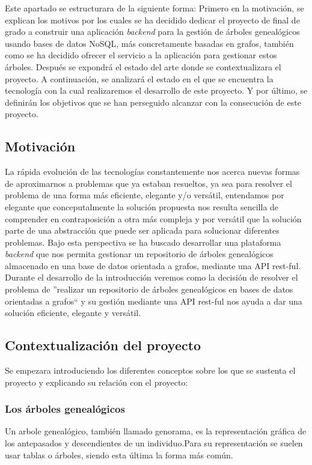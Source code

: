 
Este apartado se estructurara de la siguiente forma: Primero en la motivación, se explican los motivos por los cuales se ha decidido dedicar el proyecto de final de grado a construir una aplicación \textit{backend} para la gestión de árboles genealógicos usando bases de datos NoSQL, más concretamente basadas en grafos, también como se ha decidido ofrecer el servicio a la aplicación para gestionar estos árboles. Después se expondrá el estado del arte donde se contextualizara el proyecto. A continuación, se analizará el estado en el que se encuentra la tecnología con la cual realizaremos el desarrollo de este proyecto. Y por último, se definirán los objetivos que se han perseguido alcanzar con la consecución de este proyecto.

\subsection{Motivación}
La rápida evolución de las tecnologías constantemente nos acerca nuevas formas de aproximarnos a problemas que ya estaban resueltos, ya sea para resolver el problema de una forma más eficiente, elegante y/o versátil, entendamos por elegante que conceputalmente la solución propuesta nos resulta sencilla de comprender en contraposición a otra más compleja y por versátil que la solución parte de una abstracción que puede ser aplicada para solucionar diferentes problemas. Bajo esta perspectiva se ha buscado desarrollar una plataforma \textit{backend} que nos permita gestionar un repositorio de árboles genealógicos almacenado en una base de datos orientada a grafos, mediante una API rest-ful. Durante el desarrollo de la introducción veremos como la decisión de resolver el problema de ''realizar un repositorio de árboles genealógicos en bases de datos orientadas a grafos`` y su gestión  mediante una API rest-ful nos ayuda a dar una solución eficiente, elegante y versátil.
\newpage
\subsection{Contextualización del proyecto}
Se empezara introduciendo los diferentes conceptos sobre los que se sustenta el proyecto y explicando su relación con el proyecto:

\subsubsection{Los árboles genealógicos}
Un arbole genealógico, también llamado genorama, es la representación gráfica de los antepasados  y descendientes de un individuo.Para su representación  se suelen usar tablas o árboles, siendo esta última la forma más común.


